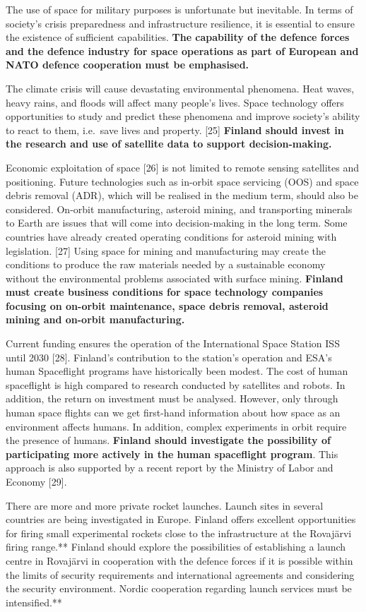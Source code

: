 \documentclass[nobib,finnish,oneside,openany,notoc,a4paper]{tufte-book}
\begin{document}
{The use of space for military purposes is unfortunate but inevitable. In
terms of society's crisis preparedness and infrastructure resilience, it
is essential to ensure the existence of sufficient capabilities.
\textbf{The capability of the defence forces and the defence industry
for space operations as part of European and NATO defence cooperation
must be emphasised.}

The climate crisis will cause devastating environmental phenomena. Heat
waves, heavy rains, and floods will affect many people's lives. Space
technology offers opportunities to study and predict these phenomena and
improve society's ability to react to them, i.e.~save lives and
property. {[}25{]} \textbf{Finland should invest in the research and use
of satellite data to support decision-making.}

Economic exploitation of space {[}26{]} is not limited to remote sensing
satellites and positioning. Future technologies such as in-orbit space
servicing (OOS) and space debris removal (ADR), which will be realised
in the medium term, should also be considered. On-orbit manufacturing,
asteroid mining, and transporting minerals to Earth are issues that will
come into decision-making in the long term. Some countries have already
created operating conditions for asteroid mining with legislation.
{[}27{]} Using space for mining and manufacturing may create the
conditions to produce the raw materials needed by a sustainable economy
without the environmental problems associated with surface mining.
\textbf{Finland must create business conditions for space technology
companies focusing on on-orbit maintenance, space debris removal,
asteroid mining and on-orbit manufacturing.}

Current funding ensures the operation of the International Space Station
ISS until 2030 {[}28{]}. Finland's contribution to the station's
operation and ESA's human Spaceflight programs have historically been
modest. The cost of human spaceflight is high compared to research
conducted by satellites and robots. In addition, the return on
investment must be analysed. However, only through human space flights
can we get first-hand information about how space as an environment
affects humans. In addition, complex experiments in orbit require the
presence of humans. \textbf{Finland should investigate the possibility
of participating more actively in the human spaceflight program}. This
approach is also supported by a recent report by the Ministry of Labor
and Economy {[}29{]}.

There are more and more private rocket launches. Launch sites in several
countries are being investigated in Europe. Finland offers excellent
opportunities for firing small experimental rockets close to the
infrastructure at the Rovajärvi firing range.** Finland should explore
the possibilities of establishing a launch centre in Rovajärvi in
\hspace{0pt}\hspace{0pt}cooperation with the defence forces if it is
possible within the limits of security requirements and international
agreements and considering the security environment. Nordic cooperation
regarding launch services must be intensified.**

}
\end{document}
